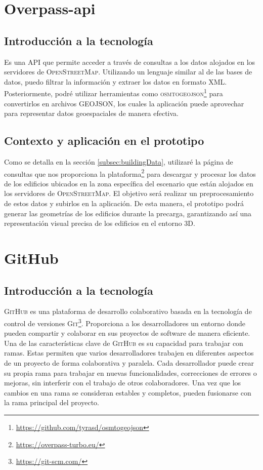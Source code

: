 \documentclass[a4paper, 11pt]{book}
\begin{document}
\section{Overpass-api}
\subsection{Introducción a la tecnología}
Es una \textsc{\gls{API}} que permite acceder a través de consultas a los datos alojados en los servidores de \textsc{OpenStreetMap}. Utilizando un lenguaje similar al de las bases de datos, puedo filtrar la información y extraer los datos en formato \textsc{XML}. Posteriormente, podré utilizar herramientas como \textsc{osmtogeojson}\footnote{\url{https://github.com/tyrasd/osmtogeojson}} para convertirlos en archivos \textsc{GEOJSON}, los cuales la aplicación puede aprovechar para representar datos geoespaciales de manera efectiva.
\subsection{Contexto y aplicación en el prototipo}
Como se detalla en la sección \ref{subsec:buildingData}, utilizaré la página de consultas que nos proporciona la plataforma\footnote{\url{https://overpass-turbo.eu/}} para descargar y procesar los datos de los edificios ubicados en la zona específica del escenario que están alojados en los servidores de \textsc{OpenStreetMap}. El objetivo será realizar un preprocesamiento de estos datos y subirlos en la aplicación. De esta manera, el prototipo podrá generar las geometrías de los edificios durante la precarga, garantizando así una representación visual precisa de los edificios en el entorno \textsc{\gls{3D}}.
\section{GitHub}
\label{sec:github}
\subsection{Introducción a la tecnología}
\textsc{GitHub} es una plataforma de desarrollo colaborativo basada en la tecnología de control de versiones \textsc{Git}\footnote{\url{https://git-scm.com/}}. Proporciona a los desarrolladores un entorno donde pueden compartir y colaborar en sus proyectos de software de manera eficiente.
Una de las características clave de \textsc{GitHub} es su capacidad para trabajar con ramas. Estas permiten que varios desarrolladores trabajen en diferentes aspectos de un proyecto de forma colaborativa y paralela. Cada desarrollador puede crear su propia rama para trabajar en nuevas funcionalidades, correcciones de errores o mejoras, sin interferir con el trabajo de otros colaboradores. Una vez que los cambios en una rama se consideran estables y completos, pueden fusionarse con la rama principal del proyecto.
\end{document}
